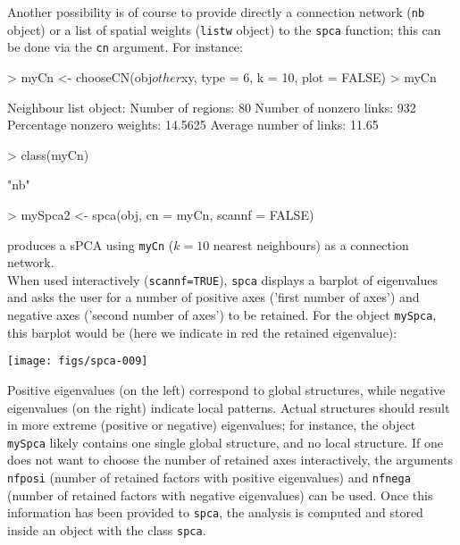 \documentclass{article}
\begin{document}
Another possibility is of course to provide directly a connection
network (\texttt{nb} object) or a list of spatial weights
(\texttt{listw} object) to the \texttt{spca} function; this can be done via the \texttt{cn} argument.
For instance:
\begin{Schunk}
\begin{Sinput}
> myCn <- chooseCN(obj$other$xy, type = 6, k = 10, plot = FALSE)
> myCn
\end{Sinput}
\begin{Soutput}
Neighbour list object:
Number of regions: 80 
Number of nonzero links: 932 
Percentage nonzero weights: 14.5625 
Average number of links: 11.65 
\end{Soutput}
\begin{Sinput}
> class(myCn)
\end{Sinput}
\begin{Soutput}
[1] "nb"
\end{Soutput}
\begin{Sinput}
> mySpca2 <- spca(obj, cn = myCn, scannf = FALSE)
\end{Sinput}
\end{Schunk}
\noindent produces a sPCA using \texttt{myCn} ($k=10$ nearest
neighbours) as a connection network.
\\


When used interactively (\texttt{scannf=TRUE}), \texttt{spca} displays a barplot of eigenvalues and
asks the user for a number of positive axes ('first number of axes') and negative
axes ('second number of axes') to be retained.
For the object \texttt{mySpca}, this barplot would be (here we
indicate in red the retained eigenvalue):
\begin{Schunk}
\end{Schunk}
\texttt{[image: figs/spca-009]}

\noindent Positive eigenvalues (on the left) correspond to global
structures, while negative eigenvalues (on the right) indicate local patterns.
Actual structures should result in more extreme (positive or
negative) eigenvalues; for instance, the object \texttt{mySpca} likely
contains one single global structure, and no local structure.
If one does not want to choose the number of retained axes
interactively, the arguments \texttt{nfposi} (number of retained
factors with positive eigenvalues) and \texttt{nfnega} (number of
retained factors with negative eigenvalues) can be used.
Once this information has been provided to \texttt{spca}, the
analysis is computed and stored inside an object with the class \texttt{spca}.
\end{document}
